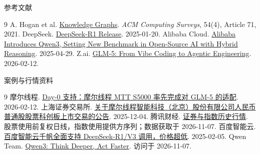 \begin{frame}{参考文献}\relax
{\fontsize{11.2}{14.5}\selectfont
\begin{thebibliography}{9}
\setlength{\itemsep}{2.5mm}
A. Hogan et al. \href{https://arxiv.org/abs/2003.02320}{Knowledge Graphs}.
\emph{ACM Computing Surveys}, 54(4), Article 71, 2021.
DeepSeek. \href{https://api-docs.deepseek.com/news/news250120/}{DeepSeek-R1 Release}. 2025-01-20.
Alibaba Cloud. \href{https://www.alibabacloud.com/en/press-room/alibaba-introduces-qwen3-setting-new-benchmark}{Alibaba Introduces Qwen3, Setting New Benchmark in Open-Source AI with Hybrid Reasoning}. 2025-04-29.
Z.ai. \href{https://z.ai/blog/glm-5}{GLM-5: From Vibe Coding to Agentic Engineering}. 2026-02-12.
\end{thebibliography}}
\end{frame}

\begin{frame}{案例与行情资料}\relax
{\fontsize{11.2}{14.5}\selectfont
\begin{thebibliography}{9}
\setlength{\itemsep}{2mm}
摩尔线程. \href{https://www.mthreads.com/news/280}{Day-0 支持：摩尔线程 MTT S5000 率先完成对 GLM-5 的适配}. 2026-02-12.
上海证券交易所. \href{https://www.sse.com.cn/disclosure/announcement/listing/ipo/c/c_20251204_10800678.shtml}{关于摩尔线程智能科技（北京）股份有限公司人民币普通股股票科创板上市交易的公告}. 2025-12-04.
腾讯财经. \href{https://web.ifzq.gtimg.cn/appstock/app/fqkline/get?param=hk02513,day,2024-12-01,2026-03-31,500,qfq}{证券与指数历史行情}.
股票使用前复权日线，指数使用提供方序列；数据获取于 2026-11-07.
百度智能云. \href{https://cloud.baidu.com/news/news_214c01fe-69f4-4e2e-8ca2-170aa44ad853}{百度智能云千帆全面支持 DeepSeek-R1/V3 调用，价格超低}. 2025-02-05.
Qwen Team. \href{https://qwenlm.github.io/blog/qwen3/}{Qwen3: Think Deeper, Act Faster}. 访问于 2026-11-07.
\end{thebibliography}}
\end{frame}
